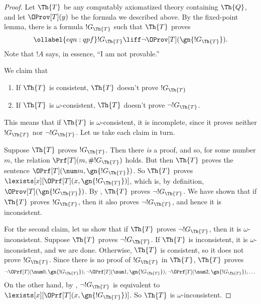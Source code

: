 \documentclass[../../include/open-logic-section]{subfiles}
\begin{document}
\begin{proof} 
Let $\Th{T}$ be any computably axiomatized theory containing $\Th{Q}$,
and let $\OProv[T](y)$ be the formula we described above. By the
fixed-point lemma, there is a formula $!G_\Th{T}$ such that $\Th{T}$ proves
\begin{equation}
\ollabel{eqn:qpf} 
!G_\Th{T} \liff \lnot \OProv[T](\gn{!G_\Th{T}}).
\end{equation}
Note that $!A$ says, in essence, ``I am not provable.''

We claim that 
\begin{enumerate}
\item If $\Th{T}$ is consistent, $\Th{T}$ doesn't prove $!G_\Th{T}$
\item If $\Th{T}$ is $\omega$-consistent, $\Th{T}$ doesn't prove
  $\lnot !G_\Th{T}$.
\end{enumerate}
This means that if $\Th{T}$ is $\omega$-consistent, it is incomplete,
since it proves neither $!G_\Th{T}$ nor $\lnot !G_\Th{T}$. Let us take
each claim in turn.

Suppose $\Th{T}$ proves $!G_\Th{T}$. Then there {\em is} a proof, and
so, for some number $m$, the relation $\Prf[T](m, \#{!G_\Th{T}})$
holds. But then $\Th{T}$ proves the sentence $\OPrf[T](\num m,
\gn{!G_\Th{T}})$. So $\Th{T}$ proves
$\lexists[x][\OPrf[T](x,\gn{!G_\Th{T}})]$, which is, by definition,
$\OProv[T](\gn{!G_\Th{T}})$. By , $\Th{T}$ proves $\lnot
!G_\Th{T}$. We have shown that if $\Th{T}$ proves $!G_\Th{T}$, then it
also proves $\lnot !G_\Th{T}$, and hence it is inconsistent.

For the second claim, let us show that if $\Th{T}$ proves $\lnot
!G_\Th{T}$, then it is $\omega$-inconsistent. Suppose $\Th{T}$ proves
$\lnot !G_\Th{T}$. If $\Th{T}$ is inconsistent, it is
$\omega$-inconsistent, and we are done. Otherwise, $\Th{T}$ is
consistent, so it does not prove $!G_\Th{T}$. Since there is no proof
of $!G_\Th{T}$ in $\Th{T}$, $\Th{T}$ proves
\[
\lnot \OPrf[T](\num 0, \gn{!G_\Th{T}}), \lnot \OPrf[T](\num 1,
\gn{!G_\Th{T}}), \lnot \OPrf[T](\num 2, \gn{!G_\Th{T}}), \dots
\]
On the other hand, by , $\lnot !G_\Th{T}$
is equivalent to $\lexists[x][\OPrf[T](x,\gn{!G_\Th{T}})]$. So $\Th{T}$
is $\omega$-inconsistent. 
\end{proof}
\end{document}
